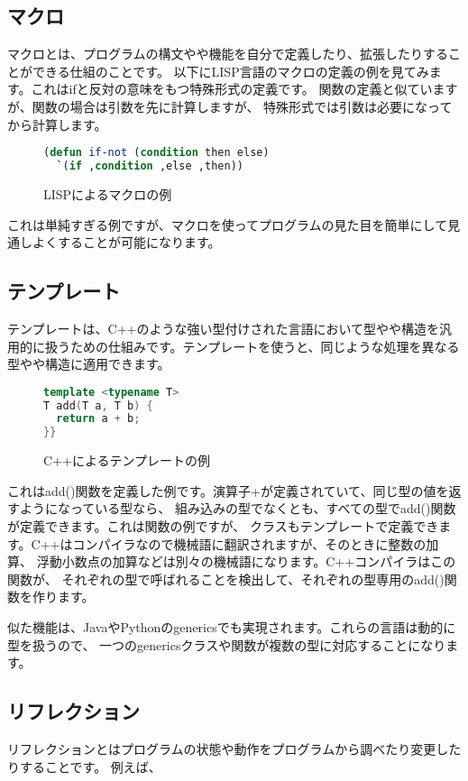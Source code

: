 \documentclass[a4j,dvipdfmx]{jsarticle}
\newcommand{\fixed}[1]{{\ttfamily #1}}
\begin{document}
\subsection{マクロ}
マクロとは、プログラムの構文やや機能を自分で定義したり、拡張したりすることができる仕組のことです。
以下にLISP言語のマクロの定義の例を見てみます。これはifと反対の意味をもつ特殊形式の定義です。
関数の定義と似ていますが、関数の場合は引数を先に計算しますが、
特殊形式では引数は必要になってから計算します。

\begin{figure}[htbp]
\centering
\begin{lstlisting}[language=Lisp]
(defun if-not (condition then else)
  `(if ,condition ,else ,then))
\end{lstlisting}
\caption{LISPによるマクロの例}
\label{fig:macro}
\end{figure}

これは単純すぎる例ですが、マクロを使ってプログラムの見た目を簡単にして見通しよくすることが可能になります。

\subsection{テンプレート}
テンプレートは、C++のような強い型付けされた言語において型やや構造を汎用的に扱うための仕組みです。テンプレートを使うと、同じような処理を異なる型やや構造に適用できます。

\begin{figure}[htbp]
\centering
\begin{lstlisting}[language=C++]
template <typename T>
T add(T a, T b) {
  return a + b;
}}
\end{lstlisting}
\caption{C++によるテンプレートの例}
\label{fig:template}
\end{figure}

これは{\fixed add()}関数を定義した例です。演算子+が定義されていて、同じ型の値を返すようになっている型なら、
組み込みの型でなくとも、すべての型で{\fixed add()}関数が定義できます。これは関数の例ですが、
クラスもテンプレートで定義できます。C++はコンパイラなので機械語に翻訳されますが、そのときに整数の加算、
浮動小数点の加算などは別々の機械語になります。C++コンパイラはこの関数が、
それぞれの型で呼ばれることを検出して、それぞれの型専用の{\fixed add()}関数を作ります。

似た機能は、JavaやPythonのgenericsでも実現されます。これらの言語は動的に型を扱うので、
一つのgenericsクラスや関数が複数の型に対応することになります。

\subsection{リフレクション}
リフレクションとはプログラムの状態や動作をプログラムから調べたり変更したりすることです。
例えば、
\end{document}
